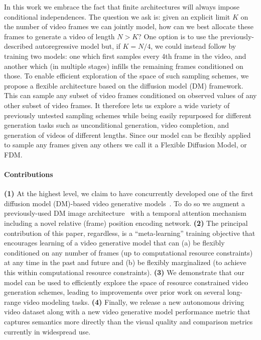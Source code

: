 In this work we embrace the fact that finite architectures will always impose conditional independences. The question we ask is: given an explicit limit $K$ on the number of video frames we can jointly model, how can we best allocate these frames to generate a video of length $N > K$? One option is to use the previously-described autoregressive model but, if $K=N/4$, we could instead follow \citet{ho2022video} by training two models: one which first samples every 4th frame in the video, and another which (in multiple stages) infills the remaining frames conditioned on those. To enable efficient exploration of the space of such sampling schemes, we propose a flexible architecture based on the diffusion model (DM) framework. This can sample any subset of video frames conditioned on observed values of any other subset of video frames. It therefore lets us explore a wide variety of previously untested sampling schemes while being easily repurposed for different generation tasks such as unconditional generation, video completion, and generation of videos of different lengths. Since our model can be flexibly applied to sample any frames given any others we call it a Flexible Diffusion Model, or FDM.

\paragraph{Contributions}
\textbf{(1)} At the highest level, we claim to have concurrently developed one of the first diffusion model (DM)-based video generative models~\cite{ho2022video,yang2022diffusion}. To do so we augment a previously-used DM image architecture~\cite{ho2020denoising,nichol2021improved} with a temporal attention mechanism including a novel relative (frame) position encoding network.  \textbf{(2)} The principal contribution of this paper, regardless, is a ``meta-learning'' training objective that encourages learning of a video generative model that can (a) be flexibly conditioned on any number of frames (up to computational resource constraints) at any time in the past and future and (b) be flexibly marginalized (to achieve this within computational resource constraints). \textbf{(3)} We demonstrate that our model can be used to efficiently explore the space of resource constrained video generation schemes, leading to improvements over prior work on several long-range video modeling tasks. \textbf{(4)} Finally, we release a new autonomous driving video dataset along with a new video generative model performance metric that captures semantics more directly than the visual quality and comparison metrics currently in widespread use.


